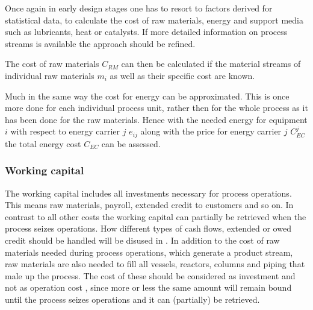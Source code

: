         Once again in early design stages one has to resort to factors derived for statistical data, to calculate
        the cost of raw materials, energy and support media such as lubricants, heat or catalysts. If more
        detailed information on process streams is available the approach should be refined.

        The cost of raw materials $C_{RM}$ can then be calculated if the material streams of individual raw materials
        $m_i$ as well as their specific cost are known.

        Much in the same way the cost for energy can be approximated. This is once more done for each individual
        process unit, rather then for the whole process as it has been done for the raw materials. Hence
        with the needed energy for equipment $i$ with respect to energy carrier $j$ $e_{ij}$ along with
        the price for energy carrier $j$ $C_{EC}^j$ the total energy cost $C_{EC}$ can be assessed.

    \subsubsection{Working capital}
        The working capital includes all investments necessary for process operations. This means raw
        materials, payroll, extended credit to customers and so on. In contrast to all other costs the
        working capital can partially be retrieved when the process seizes operations. How different
        types of cash flows, extended or owed credit should be handled will be disused in
        . In addition to the cost of raw materials needed during process
        operations, which generate a product stream, raw materials are also needed to fill all vessels, reactors,
        columns and piping that male up the process. The cost of these should be considered as investment
        and not as operation cost \cite{Coulson.1999}, since more or less the same amount will remain bound until
        the process seizes operations and it can (partially) be retrieved.

